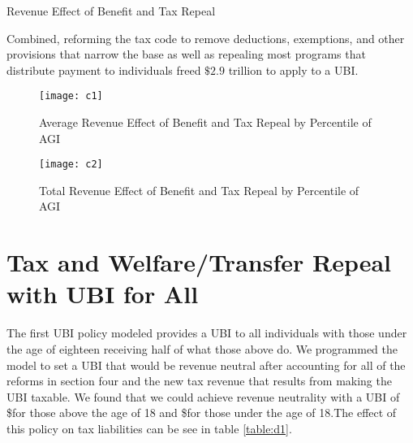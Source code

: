\documentclass{article}
\begin{document}
\begin{table}[H]
\caption{Revenue Effect of Benefit and Tax Repeal}
\begin{center}
\begin{adjustbox}{max width=\textwidth}

\end{adjustbox}
\end{center}
\end{table}

Combined, reforming the tax code to remove deductions, exemptions, and other provisions that narrow the base as well as repealing most programs that distribute payment to individuals freed $\$2.9$ trillion to apply to a UBI.

\begin{figure}[H]
\centering
\caption{Average Revenue Effect of Benefit and Tax Repeal by Percentile of AGI}
\texttt{[image: c1]}
\end{figure}

\begin{figure}[H]
\centering
\caption{Total Revenue Effect of Benefit and Tax Repeal by Percentile of AGI}
\texttt{[image: c2]}
\end{figure}



\section{Tax and Welfare/Transfer Repeal with UBI for All}

The first UBI policy modeled provides a UBI to all individuals with those under the age of eighteen receiving half of what those above do. We programmed the model to set a UBI that would be revenue neutral after accounting for all of the reforms in section four and the new tax revenue that results from making the UBI taxable. We found that we could achieve revenue neutrality with a UBI of \$\dxaa{}for those above the age of 18 and \$\dxab{}for those under the age of 18.\ospc The effect of this policy on tax liabilities can be see in table \ref{table:d1}.  
\end{document}
